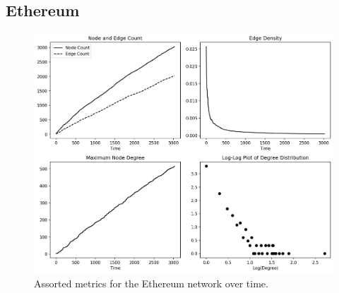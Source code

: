 \documentclass[a4paper,11pt]{article}
\begin{document}
\subsection{Ethereum}
\begin{figure}[h!]
    \includegraphics[width=1.\linewidth]{Images/Ethereum_2/graph_data.png}
    \centering
    \caption{Assorted metrics for the Ethereum network over time.}
\end{figure}
\end{document}
